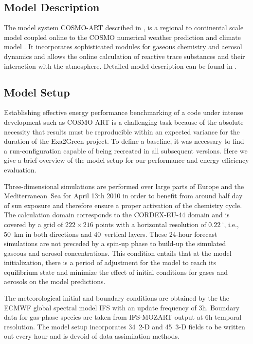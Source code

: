 \subsection{Model Description}
\label{subsec:1.1}
The  model  system COSMO-ART  described  in  \citep{Vogel-2009}, is  a
regional  to  continental scale  model  coupled  online  to the  COSMO
numerical weather  prediction and climate  model \citep{Baldauf-2011}.
It  incorporates  sophisticated  modules  for  gaseous  chemistry  and
aerosol dynamics  and allows the online calculation  of reactive trace
substances and their interaction  with the atmosphere.  Detailed model
description   can  be   found   in  \citep{Bangert-2012,   Knote-2011,
  Knote-2013}.

\subsection{Model Setup}
\label{subsec:1.2}
Establishing effective energy performance benchmarking of a code under
intense development such as COSMO-ART is a challenging task because of
the  absolute necessity that  results must  be reproducible  within an
expected variance for the duration of the Exa2Green project. To define
a baseline,  it was necessary  to find a run-configuration  capable of
being  recreated in  all subsequent  versions.  Here  we give  a brief
overview of the model setup  for our performance and energy efficiency
evaluation.

Three-dimensional simulations are performed over large parts of Europe
and the Mediterranean~Sea for April 13th 2010 in order to benefit from
around  half  day  of  sun  exposure and  therefore  ensure  a  proper
activation of the chemistry cycle.  The calculation domain corresponds
to the CORDEX-EU-44 domain and is covered by a grid of $222\times 216$
points with  a horizontal resolution of  $0.22\,^{\circ}$, i.e., 50~km
in  both directions  and 40~vertical  layers.  These  24-hour forecast
simulations  are not  preceded  by  a spin-up  phase  to build-up  the
simulated gaseous and  aerosol concentrations.  This condition entails
that at the model initialization,  there is a period of adjustment for
the model  to reach its equilibrium  state and minimize  the effect of
initial conditions for gases and aerosols on the model predictions.

The meteorological initial and boundary conditions are obtained by the
the ECMWF  global spectral model IFS  with an update  frequency of 3h.
Boundary data  for gas-phase species are taken  from IFS-MOZART output
at  6h temporal resolution.  The model  setup incorporates  34~2-D and
45~3-D  fields to  be written  out every  hour and  is devoid  of data
assimilation methods.

